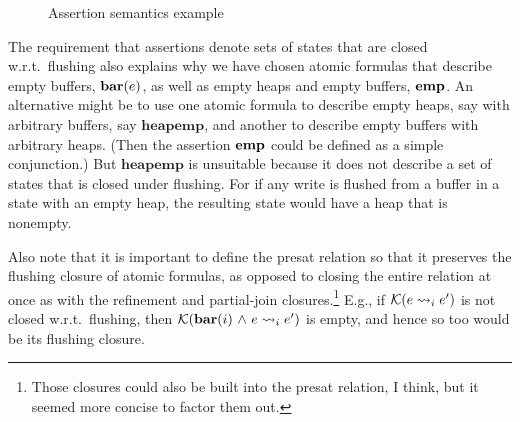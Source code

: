\documentclass[11pt]{article}
\begin{document}
\begin{figure}[ht]
	\centering
	\caption{\label{fig:leads-to-seq-example}Assertion semantics example}
\end{figure}

The requirement that assertions denote sets of states that are closed w.r.t.~flushing also explains why we have chosen atomic formulas that describe empty buffers, $\mathbf{bar}(e)$, as well as empty heaps and empty buffers, $\mathbf{emp}$. An alternative might be to use one atomic formula to describe empty heaps, say with arbitrary buffers, say $\mathbf{heapemp}$, and another to describe empty buffers with arbitrary heaps. (Then the assertion $\mathbf{emp}$ could be defined as a simple conjunction.) But $\mathbf{heapemp}$ is unsuitable because it does not describe a set of states that is closed under flushing. For if any write is flushed from a buffer in a state with an empty heap, the resulting state would have a heap that is nonempty. 

Also note that it is important to define the presat relation so that it preserves the flushing closure of atomic formulas, as opposed to closing the entire relation at once as with the refinement and partial-join closures.\footnote{Those closures could also be built into the presat relation, I think, but it seemed more concise to factor them out.} E.g., if $\mathcal{K}(e \leadsto_{i} e')$ is not closed w.r.t.~flushing, then $\mathcal{K}(\mathbf{bar}(i) \operatorname{\,\wedge\,} e \leadsto_{i} e')$ is empty, and hence so too would be its flushing closure.  
\end{document}
